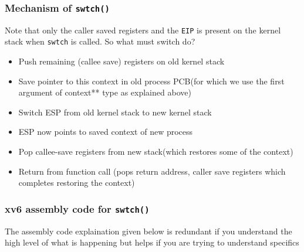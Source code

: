 \documentclass[12pt]{article}
\begin{document}
\subsubsection{Mechanism of \texttt{swtch()}}
Note that only the caller saved registers and the \texttt{EIP} is present on the kernel stack when \texttt{swtch} is called. 
So what must switch do?
\begin{itemize}[topsep=0pt, partopsep=0pt, itemsep=0pt, parsep=0pt]
    \item Push remaining (callee save) registers on old kernel stack
    \item Save pointer to this context in old process PCB(for which we use the first argument of context** type as explained above)
    \item Switch ESP from old kernel stack to new kernel stack
    \item ESP now points to saved context of new process
    \item Pop callee-save registers from new stack(which restores some of the context)
    \item Return from function call (pops return address, caller save registers which completes restoring the context)
\end{itemize}

\subsubsection{xv6 assembly code for \texttt{swtch()}}
The assembly code explaination given below is redundant if you understand the high level of what is happening but helps if you are trying to understand specifics
\end{document}
